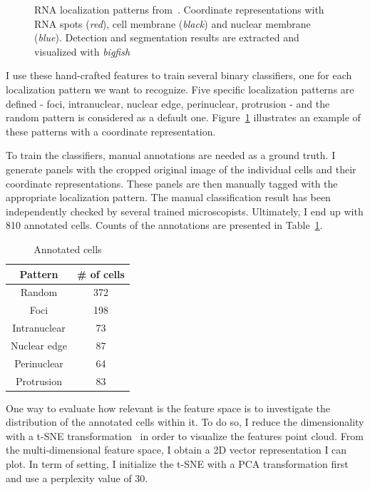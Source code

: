 \begin{figure}[]
	\endminipage
	\caption[RNA localization patterns]{RNA localization patterns from~\cite{CHOUAIB_2020}.
	Coordinate representations with RNA spots (\textit{red}), cell membrane (\textit{black}) and nuclear membrane (\textit{blue}).
	Detection and segmentation results are extracted and visualized with \emph{bigfish}}
	\label{fig:localization_patterns_racha_features}
\end{figure}

I use these hand-crafted features to train several binary classifiers, one for each localization pattern we want to recognize.
Five specific localization patterns are defined - foci, intranuclear, nuclear edge, perinuclear, protrusion - and the random pattern is considered as a default one.
Figure~\ref{fig:localization_patterns_racha_features} illustrates an example of these patterns with a coordinate representation.

To train the classifiers, manual annotations are needed as a ground truth.
I generate panels with the cropped original image of the individual cells and their coordinate representations.
These panels are then manually tagged with the appropriate localization pattern.
The manual classification result has been independently checked by several trained microscopists.
Ultimately, I end up with 810 annotated cells.
Counts of the annotations are presented in Table~\ref{table:real_dataset_chapter5}.

\begin{table}
	\centering
	\begin{tabular}{| c | c |}
		\hline
		Pattern & \# of cells \\
		\hline
		Random & 372\\
		Foci & 198\\
		Intranuclear & 73\\
		Nuclear edge & 87\\
		Perinuclear & 64\\
		Protrusion & 83\\
		\hline
	\end{tabular}
	\caption[Count of annotated cells]{Annotated cells}
	\label{table:real_dataset_chapter5}
\end{table}

One way to evaluate how relevant is the feature space is to investigate the distribution of the annotated cells within it.
To do so, I reduce the dimensionality with a \ac{t-SNE} transformation~\cite{vandermaaten_2008} in order to visualize the features point cloud.
From the multi-dimensional feature space, I obtain a 2D vector representation I can plot.
In term of setting, I initialize the \ac{t-SNE} with a PCA transformation first and use a perplexity value of 30.

